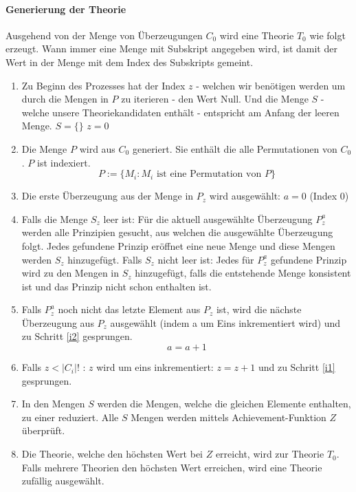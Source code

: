 \documentclass{article}
\begin{document}
\paragraph{Generierung der Theorie}
Ausgehend von der Menge von Überzeugungen $C_0$ wird eine Theorie $T_0$ wie folgt erzeugt. Wann immer eine Menge mit Subskript angegeben wird, ist damit der Wert in der Menge mit dem Index des Subskripts gemeint.
\begin{enumerate}
    \item Zu Beginn des Prozesses hat der Index $z$ - welchen wir benötigen werden um durch die Mengen in $P$ zu iterieren - den Wert Null. Und die Menge $S$ - welche unsere Theoriekandidaten enthält - entspricht am Anfang der leeren Menge. $S = \{\}$ $z = 0$
    \item Die Menge $P$ wird aus $C_0$ generiert. Sie enthält die alle Permutationen von $C_0$. $P$ ist indexiert.
    $$
        P := \{ M_i : M_i \text{ ist eine Permutation von } P\}
    $$
    \item \label{i1} Die erste Überzeugung aus der Menge in $P_z$ wird ausgewählt: $a = 0$ (Index 0)
    \item \label{i2} Falls die Menge $S_z$ leer ist: Für die aktuell ausgewählte Überzeugung $P_z^a$ werden alle Prinzipien gesucht, aus welchen die ausgewählte Überzeugung folgt. Jedes gefundene Prinzip eröffnet eine neue Menge und diese Mengen werden $S_z$ hinzugefügt. Falls $S_z$ nicht leer ist: Jedes für $P_z^a$ gefundene Prinzip wird zu den Mengen in $S_z$ hinzugefügt, falls die entstehende Menge konsistent ist und das Prinzip nicht schon enthalten ist.
    \item \label{i3} Falls $P_z^a$ noch nicht das letzte Element aus $P_z$ ist, wird die nächste Überzeugung aus $P_z$ ausgewählt (indem a um Eins inkrementiert wird) und zu Schritt \ref{i2} gesprungen.
    $$
        a = a + 1
    $$
    \item \label{i4} Falls $z < \lvert C_i \rvert!$ : $z$ wird um eins inkrementiert: $z = z + 1$ und zu Schritt \ref{i1} gesprungen.
    \item \label{i5} In den Mengen $S$ werden die Mengen, welche die gleichen Elemente enthalten, zu einer reduziert. Alle $S$ Mengen werden mittels Achievement-Funktion $Z$ überprüft.
    \item \label{i6} Die Theorie, welche den höchsten Wert bei $Z$ erreicht, wird zur Theorie $T_0$. Falls mehrere Theorien den höchsten Wert erreichen, wird eine Theorie zufällig ausgewählt.
\end{enumerate}
\end{document}
